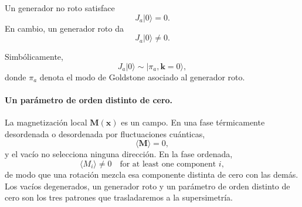 Un generador no roto satisface
\begin{equation}
J_a|0\rangle=0.
\label{eq:l9-unbroken-generator}
\end{equation}
En cambio, un generador roto da
\begin{equation}
J_a|0\rangle\neq0.
\label{eq:l9-broken-generator}
\end{equation}

\begin{classroomqa}
\end{classroomqa}

\begin{classroomqa}
\end{classroomqa}

Simbólicamente,
\begin{equation}
J_a|0\rangle
\sim
|\pi_a,\mathbf k=0\rangle,
\label{eq:l9-generator-goldstone}
\end{equation}
donde \(\pi_a\) denota el modo de Goldstone asociado al generador roto.

\paragraph{Un parámetro de orden distinto de cero.}
La magnetización local \(\mathbf M(\mathbf x)\) es un campo. En una fase térmicamente desordenada o desordenada por fluctuaciones cuánticas,
\begin{equation}
\langle\mathbf M\rangle=0,
\end{equation}
y el vacío no selecciona ninguna dirección. En la fase ordenada,
\begin{equation}
\langle M_i\rangle\neq0
\quad\text{for at least one component }i,
\label{eq:l9-magnetization-order}
\end{equation}
de modo que una rotación mezcla esa componente distinta de cero con las demás. Los vacíos degenerados, un generador roto y un parámetro de orden distinto de cero son los tres patrones que trasladaremos a la supersimetría.

